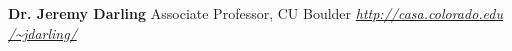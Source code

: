 \begin{minipage}{\textwidth}
    \position{}{}
    {\textbf{Dr. Jeremy Darling}}
    {{Associate Professor, CU Boulder}}
    {\href{http://casa.colorado.edu/~jdarling/}{\textit{http://casa.colorado.edu
    /\textasciitilde jdarling/}}}
    \vspace{3ex}
\end{minipage}
